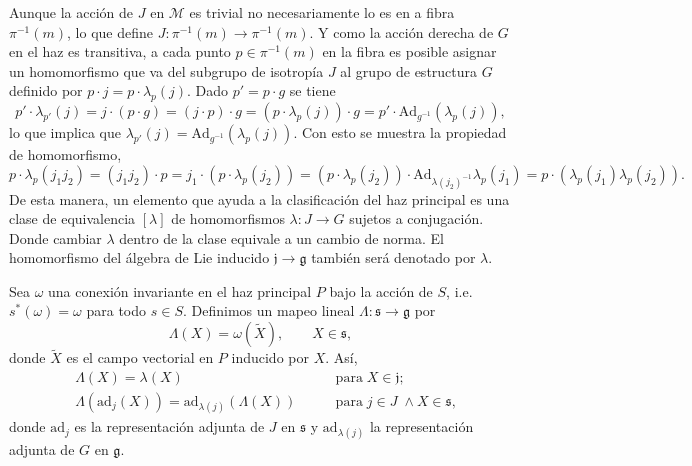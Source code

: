 Aunque la acci\'{o}n de $J$ en $\mathcal{M}$ es trivial no necesariamente lo es en a fibra $\pi^{-1} (m)$, lo que define $J: \pi^{-1} (m) \longrightarrow \pi^{-1} (m)$. Y como la acci\'{o}n derecha de $G$ en el haz es transitiva, a cada punto $p \in \pi^{-1}(m)$ en la fibra es posible asignar un homomorfismo que va del subgrupo de isotrop\'{i}a $J$ al grupo de estructura $G$ definido por $p \cdot j = p \cdot \lambda_{p} (j)$. Dado $p' = p \cdot g$ se tiene
%
\begin{equation*}
p' \cdot \lambda_{p'} (j) = j \cdot (p \cdot g) = (j \cdot p) \cdot g = (p \cdot \lambda_{p} (j)) \cdot g = p' \cdot \mathrm{Ad}_{g^{-1}} (\lambda_{p} (j)),
\end{equation*}
%
lo que implica que $\lambda_{p'} (j) = \mathrm{Ad}_{g^{-1}} (\lambda_{p} (j))$. Con esto se muestra la propiedad de homomorfismo,
%
\begin{equation*}
p \cdot \lambda_{p} (j_{1} j_{2}) = (j_{1} j_{2}) \cdot p = j_{1} \cdot (p \cdot \lambda_{p} (j_{2})) = (p \cdot \lambda_{p} (j_{2})) \cdot \mathrm{Ad}_{\lambda(j_{2})^{-1}} \lambda_{p} (j_{1}) = p \cdot (\lambda_{p} (j_{1}) \lambda_{p} (j_{2})).
\end{equation*}
%
De esta manera, un elemento que ayuda a la clasificaci\'{o}n del haz principal es una clase de equivalencia $[\lambda]$ de homomorfismos $\lambda: J \longrightarrow G$ sujetos a conjugaci\'{o}n. Donde cambiar $\lambda$ dentro de la clase equivale a un cambio de norma. El homomorfismo del \'{a}lgebra de Lie inducido $\mathfrak{j} \longrightarrow \mathfrak{g}$ tambi\'{e}n ser\'{a} denotado por $\lambda$.

Sea $\omega$ una conexi\'{o}n invariante en el haz principal $P$ bajo la acci\'{o}n de $S$, i.e. $s^{*}(\omega) = \omega$ para todo $s \in S$. Definimos un mapeo lineal $\Lambda: \mathfrak{s} \longrightarrow \mathfrak{g}$ por
%
\begin{equation}
\label{eq:correspondence}
\Lambda (X) = \omega (\tilde{X}), \qquad X \in \mathfrak{s},
\end{equation}
%
donde $\tilde{X}$ es el campo vectorial en $P$ inducido por $X$. As\'{i},
%
\begin{align}
\label{eq:LambdaCond1}
& \Lambda (X) = \lambda (X) & \mathrm{para} \; X\in \mathfrak{j}; \\
\label{eq:LambdaCond2}
& \Lambda (\mathrm{ad}_{j} (X)) = \mathrm{ad}_{\lambda (j)} (\Lambda (X)) \qquad & \mathrm{para} \; j \in J \; \land X \in \mathfrak{s},
\end{align}
%
donde $\mathrm{ad}_{j}$ es la representaci\'{o}n adjunta de $J$ en $\mathfrak{s}$ y $\mathrm{ad}_{\lambda (j)}$ la representaci\'{o}n adjunta de $G$ en $\mathfrak{g}$.

